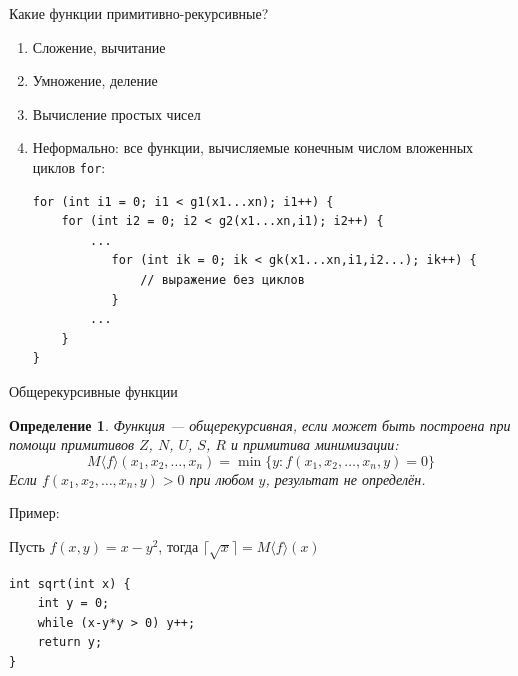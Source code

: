 \documentclass[aspectratio=169]{beamer}
\newtheorem{dfn}{Определение}[section]
\begin{document}
\begin{frame}[fragile]{Какие функции примитивно-рекурсивные?}
\begin{enumerate}
\item Сложение, вычитание\pause
\item Умножение, деление\pause
\item Вычисление простых чисел\pause
\item Неформально: все функции, вычисляемые конечным числом вложенных циклов \verb!for!:

\begin{verbatim}
for (int i1 = 0; i1 < g1(x1...xn); i1++) {
    for (int i2 = 0; i2 < g2(x1...xn,i1); i2++) {
        ...
           for (int ik = 0; ik < gk(x1...xn,i1,i2...); ik++) {
               // выражение без циклов
           }
        ...
    }
}
\end{verbatim}
\end{enumerate}
\end{frame}

\begin{frame}[fragile]{Общерекурсивные функции}
\begin{dfn}
Функция --- общерекурсивная, если может быть построена при помощи
примитивов $Z$, $N$, $U$, $S$, $R$ и примитива минимизации:
$$M\langle f \rangle (x_1,x_2,\dots,x_n) = \min\{y: f(x_1,x_2,\dots,x_n,y) = 0\}$$
Если $f(x_1,x_2,\dots,x_n,y) > 0$ при любом $y$, результат не определён.
\end{dfn}\pause


Пример:

Пусть $f(x,y) = x-y^2$, тогда $\lceil\sqrt{x}\rceil = M\langle f\rangle (x)$

\begin{verbatim}
int sqrt(int x) {
    int y = 0;
    while (x-y*y > 0) y++;
    return y;
}
\end{verbatim}

\end{frame}
\end{document}
